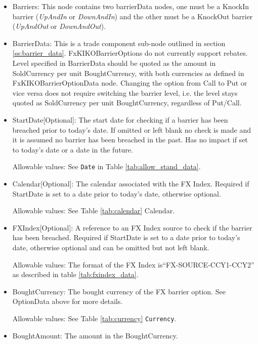 \begin{itemize}
\begin{itemize}
\end{itemize}



\item Barriers: This node contains two barrierData nodes, one must be a KnockIn barrier (\emph{UpAndIn} or \emph{DownAndIn})  and the other must be a KnockOut barrier (\emph{UpAndOut} or \emph{DownAndOut}).
\item BarrierData: This is a trade component sub-node outlined in section \ref{ss:barrier_data}. FxKIKOBarrierOptions do not currently support rebates.
Level specified in BarrierData should be quoted as the amount in SoldCurrency per unit BoughtCurrency, with both currencies as defined in FxKIKOBarrierOptionData node.
Changing the option from Call to Put or vice versa does not require switching the barrier level, i.e. the level stays quoted as SoldCurrency per unit BoughtCurrency, regardless of Put/Call.

\item StartDate[Optional]: The start date for checking if a barrier has been breached prior to today's date.  If omitted or left blank no check is made and it is assumed no barrier has been breached in the past. Has no impact if set to today's date or a date in the future.

Allowable values:  See \lstinline!Date! in Table \ref{tab:allow_stand_data}.

\item Calendar[Optional]: The calendar associated with the FX Index. Required if StartDate is set to a date prior to today's date, otherwise optional.

Allowable values: See Table \ref{tab:calendar} Calendar.

\item FXIndex[Optional]: A reference to an FX Index source to check if the barrier has been breached. Required if StartDate is set to a date prior to today's date, otherwise optional and can be omitted but not left blank.

Allowable values:  The format of the FX Index is``FX-SOURCE-CCY1-CCY2'' as described in table \ref{tab:fxindex_data}. 

\item BoughtCurrency: The bought currency of the FX barrier option. See OptionData above for more details.

Allowable values:  See Table \ref{tab:currency} \lstinline!Currency!.

\item BoughtAmount: The amount in the BoughtCurrency.  


\end{itemize}
